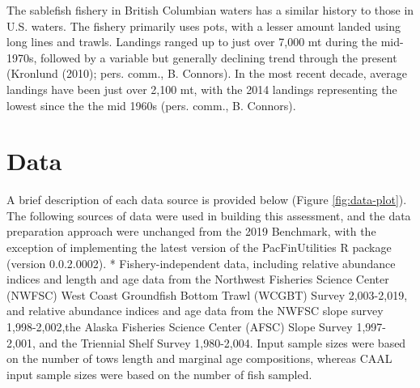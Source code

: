 \documentclass[11pt,
  english,
  a4paper,
]{article}
\begin{document}

The sablefish fishery in British Columbian waters has a similar history to those in U.S. waters. The fishery primarily uses pots, with a lesser amount landed using long lines and trawls. Landings ranged up to just over 7,000 mt during the mid-1970s, followed by a variable but generally declining trend through the present ({Kronlund (2010)\leavevmode\tagmcend\tagstructend}; pers. comm., B. Connors). In the most recent decade, average landings have been just over 2,100 mt, with the 2014 landings representing the lowest since the the mid 1960s (pers. comm., B. Connors).

\leavevmode\tagmcend\tagstructend\par


\hypertarget{data}{%
\section{Data}\label{data}}

\leavevmode\tagmcend\tagstructend


A brief description of each data source is provided below (Figure \ref{fig:data-plot}). The following sources of data were used in building this assessment, and the data preparation approach were unchanged from the 2019 Benchmark, with the exception of implementing the latest version of the PacFinUtilities R package (version 0.0.2.0002). * Fishery-independent data, including relative abundance indices and length and age data from the Northwest Fisheries Science Center (NWFSC) West Coast Groundfish Bottom Trawl (WCGBT) Survey 2,003-2,019, and relative abundance indices and age data from the NWFSC slope survey 1,998-2,002,the Alaska Fisheries Science Center (AFSC) Slope Survey 1,997-2,001, and the Triennial Shelf Survey 1,980-2,004. Input sample sizes were based on the number of tows length and marginal age compositions, whereas CAAL input sample sizes were based on the number of fish sampled.

\leavevmode\tagmcend\tagstructend\par
\end{document}
